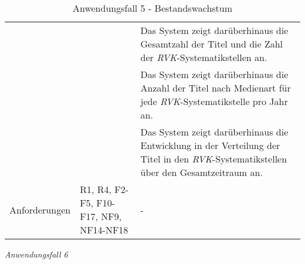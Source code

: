 \begin{table}[h]
\begin{adjustbox}{max width=\textwidth}
\begin{tabular}{lp{7.0cm}p{7.0cm}}
                                         & &Das System zeigt darüberhinaus die Gesamtzahl der Titel und die Zahl der \textit{\acrshort{RVK}}-Systematikstellen an.\\
                                         & &Das System zeigt darüberhinaus die Anzahl der Titel nach Medienart für jede \textit{\acrshort{RVK}}-Systematikstelle pro Jahr an.\\
                                         & &Das System zeigt darüberhinaus die Entwicklung in der Verteilung der Titel in den \textit{\acrshort{RVK}}-Systematikstellen über den Gesamtzeitraum an.\\

        Anforderungen                   &R1, R4, F2-F5, F10-F17, NF9, NF14-NF18& -\\
        \bottomrule
    \end{tabular}
    \end{adjustbox}
    \caption{%
    Anwendungsfall 5 - Bestandswachstum   }
    \label{tab:AF_Bestandswachstum}
    \end{table}
\endgroup


\newpage
\noindent
\textit{Anwendungsfall 6}

